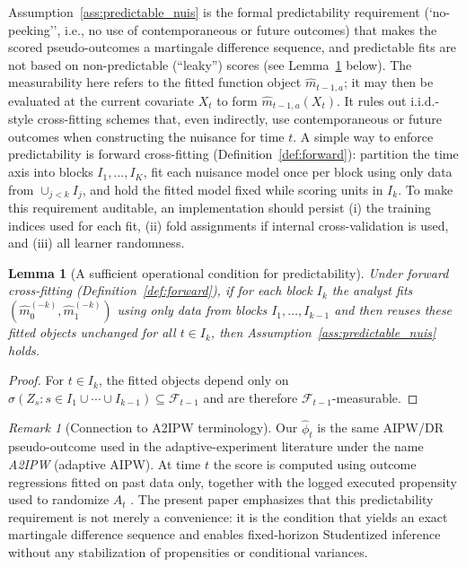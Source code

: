 \documentclass[11pt]{article}
\numberwithin{equation}{section}
\theoremstyle{plain}
\newtheorem{lemma}[theorem]{Lemma}
\theoremstyle{definition}
\theoremstyle{remark}
\newtheorem{remark}[theorem]{Remark}
\begin{document}
\noindent
Assumption~\ref{ass:predictable_nuis} is the formal predictability requirement (`no-peeking'', i.e., no use of contemporaneous or future outcomes) that makes the scored pseudo-outcomes a martingale difference sequence, and predictable fits are not based on non-predictable (``leaky'') scores (see Lemma~\ref{lem:operational_pred} below). The measurability here refers to the fitted function object $\widehat m_{t-1,a}$; it may then be evaluated at the current covariate $X_t$ to form $\widehat m_{t-1,a}(X_t)$. It rules out i.i.d.-style cross-fitting schemes that, even indirectly, use contemporaneous or future outcomes when constructing the nuisance for time $t$. A simple way to enforce predictability is forward cross-fitting (Definition~\ref{def:forward}): partition the time axis into blocks $I_1,\dots,I_K$, fit each nuisance model once per block using only data from $\cup_{j<k} I_j$, and hold the fitted model fixed while scoring units in $I_k$. To make this requirement auditable, an implementation should persist (i) the training indices used for each fit, (ii) fold assignments if internal cross-validation is used, and (iii) all learner randomness.

\begin{lemma}[A sufficient operational condition for predictability]\label{lem:operational_pred}
Under forward cross-fitting (Definition~\ref{def:forward}), if for each block
$I_k$ the analyst fits $(\widehat m_0^{(-k)},\widehat m_1^{(-k)})$ using only
data from blocks $I_1,\dots,I_{k-1}$ and then reuses these fitted objects
unchanged for all $t\in I_k$, then Assumption~\ref{ass:predictable_nuis} holds.
\end{lemma}

\begin{proof}
For $t\in I_k$, the fitted objects depend only on
$\sigma(Z_s: s\in I_1\cup\cdots\cup I_{k-1})\subseteq \mathcal{F}_{t-1}$ and are
therefore $\mathcal{F}_{t-1}$-measurable.
\end{proof}

\begin{remark}[Connection to A2IPW terminology]\label{rem:a2ipw}
Our $\widehat{\phi}_t$ is the same AIPW/DR pseudo-outcome used in the adaptive-experiment literature under the name \emph{A2IPW} (adaptive AIPW). At time $t$ the score is computed using outcome regressions fitted on past data only, together with the logged executed propensity used to randomize $A_t$ \citep{katoIshiharaHondaNarita2020,cook2024semiparametric}. The present paper emphasizes that this predictability requirement is not merely a convenience: it is the condition that yields an exact martingale difference sequence and enables fixed-horizon Studentized inference without any stabilization of propensities or conditional variances.
\end{remark}
\end{document}
